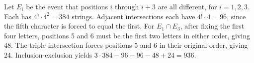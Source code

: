 Let $ E_i $ be the event that positions $ i $ through $ i+3 $ are all different, for $ i=1,2,3 $. Each has $ 4!\cdot4^2=384 $ strings. Adjacent intersections each have $ 4!\cdot4=96 $, since the fifth character is forced to equal the first. For $ E_1\cap E_3 $, after fixing the first four letters, positions 5 and 6 must be the first two letters in either order, giving 48. The triple intersection forces positions 5 and 6 in their original order, giving 24. Inclusion-exclusion yields $ 3\cdot384-96-96-48+24=\boxed{936}$.
